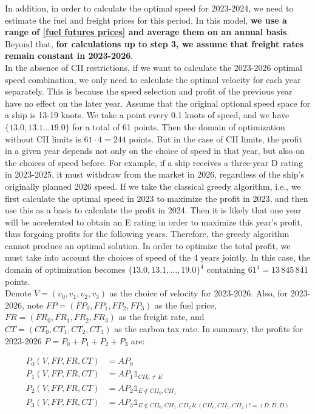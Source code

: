 \documentclass[a4paper,12pt]{article}
\begin{document}
In addition, in order to calculate the optimal speed for 2023-2024, we need to estimate the fuel and freight prices for this period.
In this model, \textbf{we use a range of \href{https://www.cmegroup.com/markets/energy/refined-products/singapore-380cst-fuel-oil-platts-swap-futures.html}{[fuel futures prices]} and average them on an annual basis}.
Beyond that, \textbf{for calculations up to step 3, we assume that freight rates remain constant in 2023-2026}.\\


In the absence of CII restrictions, if we want to calculate the 2023-2026 optimal speed combination, we only need to calculate the optimal velocity for each year separately.
This is because the speed selection and profit of the previous year have no effect on the later year.
Assume that the original optional speed space for a ship is 13-19 knots.
We take a point every 0.1 knots of speed, and we have $\{13.0, 13.1 ... 19.0\}$ for a total of 61 points.
Then the domain of optimization without CII limits is $61 \cdot 4 = 244$ points.
But in the case of CII limits, the profit in a given year depends not only on the choice of speed in that year, but also on the choices of speed before.
For example, if a ship receives a three-year D rating in 2023-2025, it must withdraw from the market in 2026, regardless of the ship's originally planned 2026 speed.
If we take the classical greedy algorithm, i.e., we first calculate the optimal speed in 2023 to maximize the profit in 2023, and then use this as a basis to calculate the profit in 2024.
Then it is likely that one year will be accelerated to obtain an E rating in order to maximize this year's profit, thus forgoing profits for the following years.
Therefore, the greedy algorithm cannot produce an optimal solution.
In order to optimize the total profit, we must take into account the choices of speed of the 4 years jointly.
In this case, the domain of optimization becomes $\{13.0, 13.1, ..., 19.0\}^4$ containing $61^4 = 13 \,845 \,841$ points.\\



Denote $V = (v_0, v_1, v_2, v_3)$ as the choice of velocity for 2023-2026.
Also, for 2023-2026, note $FP=(FP_0, FP_1,FP_2,FP_3)$ as the fuel price, $FR=(FR_0,FR_1,FR_2,FR_3)$ as the freight rate, and $CT=(CT_0, CT_1, CT_2, CT_3)$ as the carbon tax rate.
In summary, the profits for 2023-2026 $P=P_0+P_1+P_2+P_3$ are:

\begin{align}
	\label{eq:P}
	P_0(V, FP, FR, CT ) & = AP_0                                                                                   \\
	P_1(V, FP, FR, CT ) & = AP_1 \mathds{1} _{CII_0 \neq E}                                                        \\
	P_2(V, FP, FR, CT ) & = AP_2 \mathds{1} _{E \notin {CII_0, CII_1}}                                             \\
	P_3(V, FP, FR, CT ) & = AP_3 \mathds{1} _{E \notin {CII_0, CII_1, CII_2}\,\&\, (CII_0, CII_1, CII_2)!=(D,D,D)}
\end{align}
\end{document}
